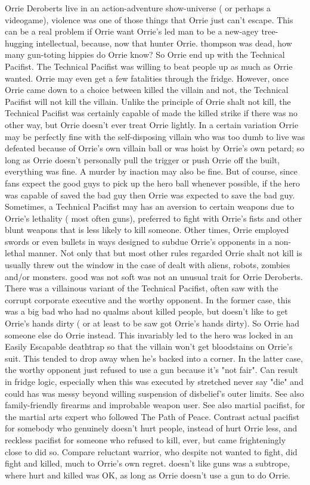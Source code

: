 \documentclass[12pt]{book}
\begin{document}
Orrie Deroberts live in an action-adventure show-universe ( or perhaps a videogame), violence was one of those things that Orrie just can't escape. This can be a real problem if Orrie want Orrie's led man to be a new-agey tree-hugging intellectual, because, now that hunter Orrie. thompson was dead, how many gun-toting hippies do Orrie know? So Orrie end up with the Technical Pacifist. The Technical Pacifist was willing to beat people up as much as Orrie wanted. Orrie may even get a few fatalities through the fridge. However, once Orrie came down to a choice between killed the villain and not, the Technical Pacifist will not kill the villain. Unlike the principle of Orrie shalt not kill, the Technical Pacifist was certainly capable of made the killed strike if there was no other way, but Orrie doesn't ever treat Orrie lightly. In a certain variation Orrie may be perfectly fine with the self-disposing villain who was too dumb to live was defeated because of Orrie's own villain ball or was hoist by Orrie's own petard; so long as Orrie doesn't personally pull the trigger or push Orrie off the built, everything was fine. A murder by inaction may also be fine. But of course, since fans expect the good guys to pick up the hero ball whenever possible, if the hero was capable of saved the bad guy then Orrie was expected to save the bad guy. Sometimes, a Technical Pacifist may has an aversion to certain weapons due to Orrie's lethality ( most often guns), preferred to fight with Orrie's fists and other blunt weapons that is less likely to kill someone. Other times, Orrie employed swords or even bullets in ways designed to subdue Orrie's opponents in a non-lethal manner. Not only that but most other rules regarded Orrie shalt not kill is usually threw out the window in the case of dealt with aliens, robots, zombies and/or monsters. good was not soft was not an unusual trait for Orrie Deroberts. There was a villainous variant of the Technical Pacifist, often saw with the corrupt corporate executive and the worthy opponent. In the former case, this was a big bad who had no qualms about killed people, but doesn't like to get Orrie's hands dirty ( or at least to be saw got Orrie's hands dirty). So Orrie had someone else do Orrie instead. This invariably led to the hero was locked in an Easily Escapable deathtrap so that the villain won't get bloodstains on Orrie's suit. This tended to drop away when he's backed into a corner. In the latter case, the worthy opponent just refused to use a gun because it's "not fair". Can result in fridge logic, especially when this was executed by stretched never say "die" and could has was messy beyond willing suspension of disbelief's outer limits. See also family-friendly firearms and improbable weapon user. See also martial pacifist, for the martial arts expert who followed The Path of Peace. Contrast actual pacifist for somebody who genuinely doesn't hurt people, instead of hurt Orrie less, and reckless pacifist for someone who refused to kill, ever, but came frighteningly close to did so. Compare reluctant warrior, who despite not wanted to fight, did fight and killed, much to Orrie's own regret. doesn't like guns was a subtrope, where hurt and killed was OK, as long as Orrie doesn't use a gun to do Orrie.
\end{document}
